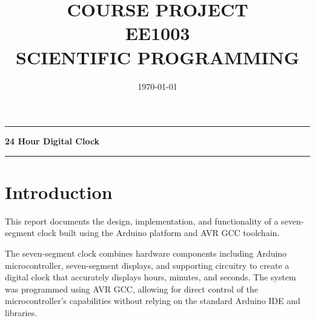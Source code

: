 \documentclass[journal]{IEEEtran}
\begin{document}

\title{\Large\bfseries COURSE PROJECT\\[0.2cm] EE1003 \\[0.2cm] SCIENTIFIC PROGRAMMING}
\date{\today}

\maketitle

\noindent\rule{\textwidth}{0.4pt}

\begin{center}
    \textbf{24 Hour Digital Clock}
\end{center}

\vspace{0.2cm}
\noindent\rule{\textwidth}{0.5pt}

\vspace{1.5cm}

\vfill


\renewcommand{\thefigure}{\theenumi}
\renewcommand{\thetable}{\theenumi}
\newpage
\tableofcontents
\newpage
\section{Introduction}

This report documents the design, implementation, and functionality of a seven-segment clock built using the Arduino platform and AVR GCC toolchain. 

The seven-segment clock combines hardware components including Arduino microcontroller, seven-segment displays, and supporting circuitry to create a digital clock that accurately displays hours, minutes, and seconds. The system was programmed using AVR GCC, allowing for direct control of the microcontroller's capabilities without relying on the standard Arduino IDE and libraries.
\end{document}
